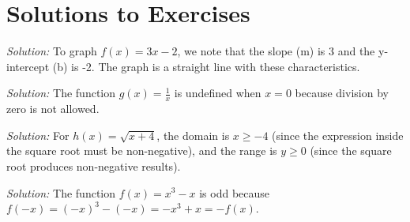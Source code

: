 \documentclass[a4paper,12pt]{book}
\newenvironment{solution}[1][]
{\par\noindent\textit{Solution:} \rmfamily}{\medskip}
\begin{document}

\section{Solutions to Exercises}

\begin{solution}[1]
To graph \( f(x) = 3x - 2 \), we note that the slope (m) is 3 and the y-intercept (b) is -2. The graph is a straight line with these characteristics.

\end{solution}

\begin{solution}[2]
The function \( g(x) = \frac{1}{x} \) is undefined when \( x = 0 \) because division by zero is not allowed.
\end{solution}

\begin{solution}[3]
For \( h(x) = \sqrt{x + 4} \), the domain is \( x \geq -4 \) (since the expression inside the square root must be non-negative), and the range is \( y \geq 0 \) (since the square root produces non-negative results).
\end{solution}

\begin{solution}[4]
The function \( f(x) = x^3 - x \) is odd because \( f(-x) = (-x)^3 - (-x) = -x^3 + x = -f(x) \).
\end{solution}
\end{document}
